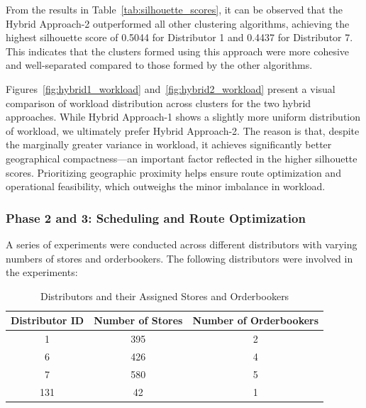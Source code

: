 From the results in Table~\ref{tab:silhouette_scores}, it can be observed that the Hybrid Approach-2 outperformed all other clustering algorithms, achieving the highest silhouette score of 0.5044 for Distributor 1 and 0.4437 for Distributor 7. This indicates that the clusters formed using this approach were more cohesive and well-separated compared to those formed by the other algorithms.

Figures~\ref{fig:hybrid1_workload} and~\ref{fig:hybrid2_workload} present a visual comparison of workload distribution across clusters for the two hybrid approaches. While Hybrid Approach-1 shows a slightly more uniform distribution of workload, we ultimately prefer Hybrid Approach-2. The reason is that, despite the marginally greater variance in workload, it achieves significantly better geographical compactness—an important factor reflected in the higher silhouette scores. Prioritizing geographic proximity helps ensure route optimization and operational feasibility, which outweighs the minor imbalance in workload.


\subsubsection{Phase 2 and 3: Scheduling and Route Optimization}
A series of experiments were conducted across different distributors with varying numbers of stores and orderbookers. The following distributors were involved in the experiments:
\begin{table}[h!]
\centering
\begin{tabular}{|c|c|c|}
\hline
\textbf{Distributor ID} & \textbf{Number of Stores} & \textbf{Number of Orderbookers} \\
\hline
1 & 395 & 2 \\
6 & 426 & 4 \\
7 & 580 & 5 \\
131 & 42 & 1 \\
\hline
\end{tabular}
\caption{Distributors and their Assigned Stores and Orderbookers}
\end{table}

